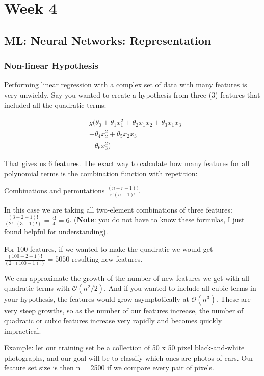 \chapter{Week 4}
\section{ML: Neural Networks: Representation}
\subsection{Non-linear Hypothesis}
Performing linear regression with a complex set of data with many features is very unwieldy. Say you wanted to create a hypothesis from three (3) features that included all the quadratic terms:

\begin{align*}
&g(\theta_0 + \theta_1 x_1^2 + \theta_2x_1x_2+ \theta_3x_1x_3 \\
&+ \theta_4x_2^2 + \theta_5x_2x_3 \\
&+\theta_6x_3^2)
\end{align*}

That gives us 6 features. The exact way to calculate how many features for all polynomial terms is the combination function with repetition:

\href{http://www.mathsisfun.com/combinatorics/combinations-permutations.html}{Combinations and permutations} $\frac{(n+r-1)!}{r!(n-1)!}$.

In this case we are taking all two-element combinations of three features: $\frac{(3 + 2 - 1)!}{(2!\cdot (3-1)!)} = \frac{4!}{4} = 6 $.
(\textbf{Note}: you do not have to know these formulas, I just found helpful for understanding).

For 100 features, if we wanted to make the quadratic we would get $ \frac{(100 + 2 - 1)!}{(2\cdot (100-1)!)} = 5050 $ resulting new features.

We can approximate the growth of the number of new features we get with all quadratic terms with $\mathcal{O}(n^2/2)$. And if you wanted to include all cubic terms in your hypothesis, the features would grow asymptotically at $\mathcal{O}(n^3)$. These are very steep growths, so as the number of our features increase, the number of quadratic or cubic features increase very rapidly and becomes quickly impractical.

Example: let our training set be a collection of 50 x 50 pixel black-and-white photographs, and our goal will be to classify which ones are photos of cars. Our feature set size is then n = 2500 if we compare every pair of pixels.

